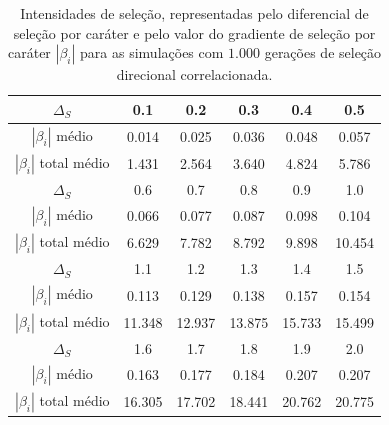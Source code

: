 \begin{table}[htbp]
    \centering
    \caption{Intensidades de seleção, representadas pelo diferencial de
        seleção por caráter e pelo valor do gradiente de seleção por
        caráter $|\beta_i|$ para as simulações com $1.000$ gerações de
        seleção direcional correlacionada.}
    \label{tab:betasSS}
    \vspace{1em}
    \begin{tabular}{c|c|c|c|c|c}
        \toprule
        $\Delta_S$ & 0.1 & 0.2 & 0.3 & 0.4 & 0.5 \\
        \hline
        $|\beta_i|$ médio & 0.014 & 0.025 & 0.036 & 0.048 & 0.057 \\
         $|\beta_i|$ total médio & 1.431 & 2.564 & 3.640 & 4.824 & 5.786 \\ 
        \midrule
        \midrule
        $\Delta_S$ & 0.6 & 0.7 & 0.8 & 0.9 & 1.0 \\
        \hline
        $|\beta_i|$ médio & 0.066 & 0.077 & 0.087 & 0.098 & 0.104 \\
         $|\beta_i|$ total médio & 6.629 & 7.782 & 8.792 & 9.898 & 10.454 \\ 
        \midrule
        \midrule
        $\Delta_S$ & 1.1  & 1.2  & 1.3  & 1.4  & 1.5 \\ 
        \hline
        $|\beta_i|$ médio & 0.113 & 0.129 & 0.138 & 0.157 & 0.154 \\
         $|\beta_i|$ total médio & 11.348 & 12.937 & 13.875 & 15.733 & 15.499 \\ 
        \midrule
        \midrule
        $\Delta_S$ & 1.6  & 1.7  & 1.8  & 1.9  & 2.0 \\ 
        \hline
        $|\beta_i|$ médio & 0.163 & 0.177 & 0.184 & 0.207 & 0.207 \\
         $|\beta_i|$ total médio & 16.305 & 17.702 & 18.441 & 20.762 & 20.775 \\
        \bottomrule
    \end{tabular}
\end{table}

